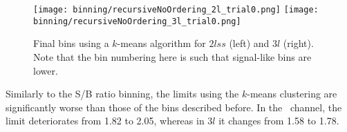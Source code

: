 \begin{figure} [!h]
  \centering
  \texttt{[image: binning/recursiveNoOrdering\_2l\_trial0.png]}
  \texttt{[image: binning/recursiveNoOrdering\_3l\_trial0.png]}
  \caption[Final bins using a $k$-means algorithm.]{Final bins using a $k$-means algorithm for $2lss$ (left) and $3l$ (right). Note that the bin numbering here is such that signal-like bins are lower.}
  \label{fig:kmeansfinalbins}
\end{figure}

Similarly to the S/B ratio binning, the limits using the $k$-means clustering are significantly worse than those of the bins described before. In the \mumu\ channel, the limit deteriorates from 1.82 to 2.05, whereas in $3l$ it changes from 1.58 to 1.78.
